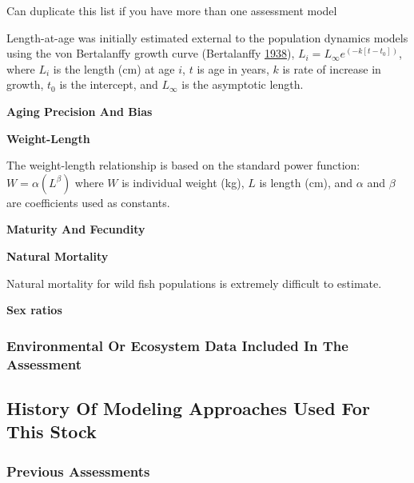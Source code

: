\documentclass[12pt,]{article}
\begin{document}
Can duplicate this list if you have more than one assessment model

Length-at-age was initially estimated external to the population
dynamics models using the von Bertalanffy growth curve (Bertalanffy
\protect\hyperlink{ref-vonB1938}{1938}),
\(L_i = L_{\infty}e^{(-k[t-t_0])}\), where \(L_i\) is the length (cm) at
age \(i\), \(t\) is age in years, \(k\) is rate of increase in growth,
\(t_0\) is the intercept, and \(L_{\infty}\) is the asymptotic length.

\vspace{.5cm}

\textbf{Aging Precision And Bias}

\vspace{.5cm}

\textbf{Weight-Length}

The weight-length relationship is based on the standard power function:
\(W = \alpha(L^\beta)\) where \(W\) is individual weight (kg), \(L\) is
length (cm), and \(\alpha\) and \(\beta\) are coefficients used as
constants.

\vspace{.5cm}

\textbf{Maturity And Fecundity}

\vspace{.5cm}

\textbf{Natural Mortality}

Natural mortality for wild fish populations is extremely difficult to
estimate.

\vspace{.5cm}

\textbf{Sex ratios}

\subsubsection{Environmental Or Ecosystem Data Included In The
Assessment}\label{environmental-or-ecosystem-data-included-in-the-assessment}

\subsection{History Of Modeling Approaches Used For This
Stock}\label{history-of-modeling-approaches-used-for-this-stock}

\subsubsection{Previous Assessments}\label{previous-assessments}
\end{document}
